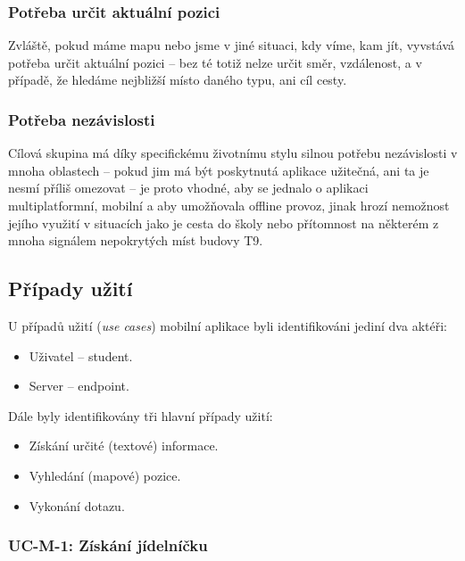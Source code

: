\subsubsection{Potřeba určit aktuální pozici}
Zvláště, pokud máme mapu nebo jsme v jiné situaci, kdy víme, kam jít, vyvstává potřeba určit aktuální pozici -- bez té totiž nelze určit směr, vzdálenost, a v případě, že hledáme nejbližší místo daného typu, ani cíl cesty.

\subsubsection{Potřeba nezávislosti}
Cílová skupina má díky specifickému životnímu stylu silnou potřebu nezávislosti v mnoha oblastech -- pokud jim má být poskytnutá aplikace užitečná, ani ta je nesmí příliš omezovat -- je proto vhodné, aby se jednalo o aplikaci multiplatformní, mobilní a aby umožňovala offline provoz, jinak hrozí nemožnost jejího využití v situacích jako je cesta do školy nebo přítomnost na některém z mnoha signálem nepokrytých míst budovy T9.



\subsection{Případy užití}
U případů užití (\textit{use cases}) mobilní aplikace byli identifikováni jediní dva aktéři:
\begin{itemize}
 \item Uživatel -- student.
 \item Server --  endpoint.
\end{itemize}
Dále byly identifikovány tři hlavní případy užití:
\begin{itemize}
 \item Získání určité (textové) informace.
 \item Vyhledání (mapové) pozice.
 \item Vykonání  dotazu.
\end{itemize}

\subsubsection{UC-M-1: Získání jídelníčku}
